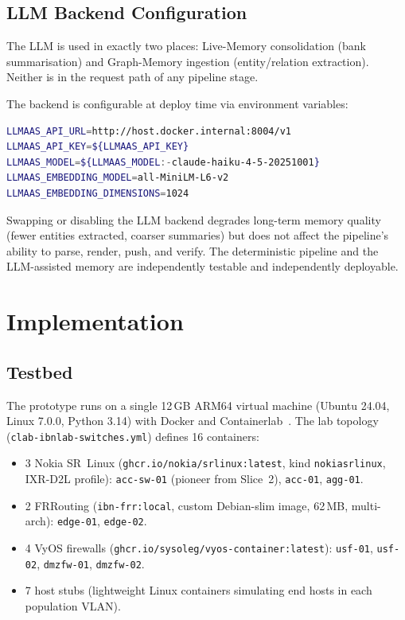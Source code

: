 \documentclass[acmtog]{acmart}
\renewcommand\_{\textunderscore\allowbreak}
\begin{document}
\subsection{LLM Backend Configuration}\label{sec:memory:llm}

The LLM is used in exactly two places: Live-Memory consolidation
(bank summarisation) and Graph-Memory ingestion (entity/relation
extraction). Neither is in the request path of any pipeline stage.

The backend is configurable at deploy time via environment
variables:

\begin{lstlisting}[language=bash,numbers=none,caption={LLM configuration in \texttt{docker-compose.yml}.}]
LLMAAS_API_URL=http://host.docker.internal:8004/v1
LLMAAS_API_KEY=${LLMAAS_API_KEY}
LLMAAS_MODEL=${LLMAAS_MODEL:-claude-haiku-4-5-20251001}
LLMAAS_EMBEDDING_MODEL=all-MiniLM-L6-v2
LLMAAS_EMBEDDING_DIMENSIONS=1024
\end{lstlisting}

Swapping or disabling the LLM backend degrades long-term memory
quality (fewer entities extracted, coarser summaries) but does not
affect the pipeline's ability to parse, render, push, and verify.
The deterministic pipeline and the LLM-assisted memory are
independently testable and independently deployable.


\section{Implementation}\label{sec:impl}

\subsection{Testbed}\label{sec:impl:testbed}

The prototype runs on a single 12\,GB ARM64 virtual machine (Ubuntu
24.04, Linux 7.0.0, Python 3.14) with Docker and
Containerlab~\cite{containerlab}. The lab topology
(\texttt{clab-ibnlab-switches.yml}) defines 16 containers:

\begin{itemize}
  \item 3 Nokia SR~Linux (\texttt{ghcr.io/nokia/srlinux:latest},
    kind \texttt{nokia\_srlinux}, IXR-D2L profile): \texttt{acc-sw-01}
    (pioneer from Slice~2), \texttt{acc-01}, \texttt{agg-01}.
  \item 2 FRRouting (\texttt{ibn-frr:local}, custom Debian-slim
    image, 62\,MB, multi-arch): \texttt{edge-01}, \texttt{edge-02}.
  \item 4 VyOS firewalls (\texttt{ghcr.io/sysoleg/vyos-container:latest}):
    \texttt{usf-01}, \texttt{usf-02}, \texttt{dmzfw-01},
    \texttt{dmzfw-02}.
  \item 7 host stubs (lightweight Linux containers simulating end
    hosts in each population VLAN).
\end{itemize}
\end{document}
